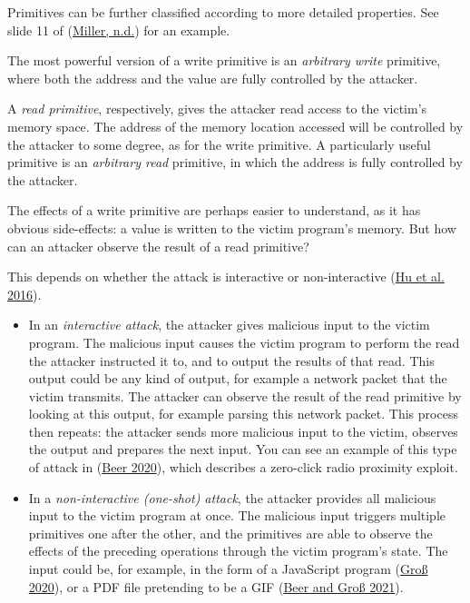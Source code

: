 \documentclass[
  a4paper,
]{report}
\providecommand{\tightlist}{%
  \setlength{\itemsep}{0pt}\setlength{\parskip}{0pt}}
\begin{document}
Primitives can be further classified according to more detailed
properties. See slide 11 of (\protect\hyperlink{ref-Miller2012}{Miller,
n.d.}) for an example.

The most powerful version of a write primitive is an \emph{arbitrary
write} primitive, where both the address and the value are fully
controlled by the attacker.

A \emph{read primitive}, respectively, gives the
attacker read access to the victim's memory space. The address of the
memory location accessed will be controlled by the attacker to some
degree, as for the write primitive. A particularly useful primitive is
an \emph{arbitrary read} primitive, in which the address is fully
controlled by the attacker.

The effects of a write primitive are perhaps easier to understand, as it
has obvious side-effects: a value is written to the victim program's
memory. But how can an attacker observe the result of a read primitive?

This depends on whether the attack is interactive or non-interactive
(\protect\hyperlink{ref-Hu2016}{Hu et al. 2016}).

\begin{itemize}
\tightlist
\item
  In an \emph{interactive attack}, the
  attacker gives malicious input to the victim program. The malicious
  input causes the victim program to perform the read the attacker
  instructed it to, and to output the results of that read. This output
  could be any kind of output, for example a network packet that the
  victim transmits. The attacker can observe the result of the read
  primitive by looking at this output, for example parsing this network
  packet. This process then repeats: the attacker sends more malicious
  input to the victim, observes the output and prepares the next input.
  You can see an example of this type of attack in
  (\protect\hyperlink{ref-Beer2020}{Beer 2020}), which describes a
  zero-click radio proximity exploit.
\item
  In a \emph{non-interactive (one-shot)
  attack}, the attacker provides all malicious input to the victim
  program at once. The malicious input triggers multiple primitives one
  after the other, and the primitives are able to observe the effects of
  the preceding operations through the victim program's state. The input
  could be, for example, in the form of a JavaScript program
  (\protect\hyperlink{ref-Grouxdf2020}{Groß 2020}), or a PDF file
  pretending to be a GIF (\protect\hyperlink{ref-Beer2021}{Beer and Groß
  2021}).
\end{itemize}
\end{document}
